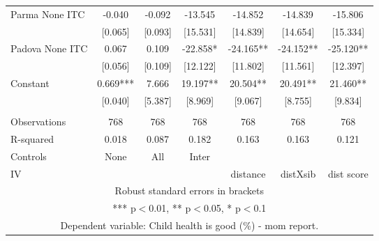 \begin{tabular}{lcccccc}
Parma None ITC & -0.040 & -0.092 & -13.545 & -14.852 & -14.839 & -15.806 \\
 & [0.065] & [0.093] & [15.531] & [14.839] & [14.654] & [15.334] \\
Padova None ITC & 0.067 & 0.109 & -22.858* & -24.165** & -24.152** & -25.120** \\
 & [0.056] & [0.109] & [12.122] & [11.802] & [11.561] & [12.397] \\
Constant & 0.669*** & 7.666 & 19.197** & 20.504** & 20.491** & 21.460** \\
 & [0.040] & [5.387] & [8.969] & [9.067] & [8.755] & [9.834] \\
 &  &  &  &  &  &  \\
Observations & 768 & 768 & 768 & 768 & 768 & 768 \\
R-squared & 0.018 & 0.087 & 0.182 & 0.163 & 0.163 & 0.121 \\
Controls & None & All & Inter &  &  &  \\
 IV &  &  &  & distance & distXsib & dist score \\ \hline
\multicolumn{7}{c}{ Robust standard errors in brackets} \\
\multicolumn{7}{c}{ *** p$<$0.01, ** p$<$0.05, * p$<$0.1} \\
\multicolumn{7}{c}{ Dependent variable: Child health is good (\%) - mom report.} \\
\end{tabular}
